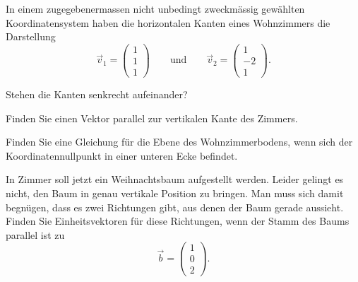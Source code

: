 In einem zugegebenermassen nicht unbedingt zweckmässig gewählten
Koordinatensystem haben die horizontalen Kanten eines Wohnzimmers
die Darstellung
\[
\vec v_1=\begin{pmatrix}
1\\1\\1
\end{pmatrix}
\qquad\text{und}\qquad
\vec v_2=\begin{pmatrix}
1\\-2\\1
\end{pmatrix}.
\]
\begin{teilaufgaben}
\item Stehen die Kanten senkrecht aufeinander?
\item Finden Sie einen Vektor parallel zur vertikalen Kante
des Zimmers.
\item Finden Sie eine Gleichung für die Ebene des Wohnzimmerbodens, wenn
sich der Koordinatennullpunkt in einer unteren Ecke befindet.
\item In Zimmer soll jetzt ein Weihnachtsbaum aufgestellt werden.
Leider gelingt es nicht, den Baum in genau vertikale Position zu
bringen. Man muss sich damit begnügen, dass es zwei Richtungen
gibt, aus denen der Baum gerade aussieht. Finden Sie Einheitsvektoren
für diese Richtungen,
wenn der Stamm des Baums parallel ist zu
\[
\vec b=\begin{pmatrix}
1\\0\\2
\end{pmatrix}.
\]
\end{teilaufgaben}

